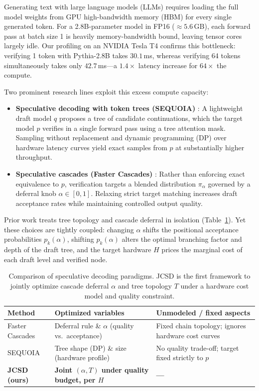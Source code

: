 \documentclass[10pt]{article}
\begin{document}
Generating text with large language models (LLMs) requires loading the full model weights from GPU high-bandwidth memory (HBM) for every single generated token. For a 2.8B-parameter model in FP16 ($\approx 5.6$\,GB), each forward pass at batch size 1 is heavily memory-bandwidth bound, leaving tensor cores largely idle. Our profiling on an NVIDIA Tesla T4 confirms this bottleneck: verifying 1 token with Pythia-2.8B takes $30.1$\,ms, whereas verifying 64 tokens simultaneously takes only $42.7$\,ms—a $1.4\times$ latency increase for $64\times$ the compute.

Two prominent research lines exploit this excess compute capacity:
\begin{itemize}
    \item \textbf{Speculative decoding with token trees (SEQUOIA)} \citep{chen2024sequoia}: A lightweight draft model $q$ proposes a tree of candidate continuations, which the target model $p$ verifies in a single forward pass using a tree attention mask. Sampling without replacement and dynamic programming (DP) over hardware latency curves yield exact samples from $p$ at substantially higher throughput.
    \item \textbf{Speculative cascades (Faster Cascades)} \citep{narasimhan2025faster}: Rather than enforcing exact equivalence to $p$, verification targets a blended distribution $\pi_\alpha$ governed by a deferral knob $\alpha \in [0, 1]$. Relaxing strict target matching increases draft acceptance rates while maintaining controlled output quality.
\end{itemize}

Prior work treats tree topology and cascade deferral in isolation (Table~\ref{tab:gap}). Yet these choices are tightly coupled: changing $\alpha$ shifts the positional acceptance probabilities $p_k(\alpha)$, shifting $p_k(\alpha)$ alters the optimal branching factor and depth of the draft tree, and the target hardware $H$ prices the marginal cost of each draft level and verified node.

\begin{table}[h]
  \caption{Comparison of speculative decoding paradigms. JCSD is the first framework to jointly optimize cascade deferral $\alpha$ and tree topology $T$ under a hardware cost model and quality constraint.}
  \label{tab:gap}
  \centering
  \small
  \begin{tabularx}{\linewidth}{@{}lXX@{}}
    \toprule
    Method & Optimized variables & Unmodeled / fixed aspects \\
    \midrule
    Faster Cascades \citep{narasimhan2025faster} & Deferral rule \& $\alpha$ (quality vs.\ acceptance) & Fixed chain topology; ignores hardware cost curves \\
    SEQUOIA \citep{chen2024sequoia} & Tree shape (DP) \& size (hardware profile) & No quality trade-off; target fixed strictly to $p$ \\
    \textbf{JCSD (ours)} & \textbf{Joint $(\alpha, T)$ under quality budget, per $H$} & \textbf{---} \\
    \bottomrule
  \end{tabularx}
  \vspace{11pt}
\end{table}
\end{document}

